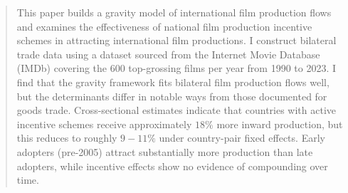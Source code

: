 \begin{abstract}
This paper builds a gravity model of international film production flows and examines the effectiveness of national film production incentive schemes in attracting international film productions. I construct bilateral trade data using a dataset sourced from the Internet Movie Database (IMDb) covering the 600 top-grossing films per year from 1990 to 2023. I find that the gravity framework fits bilateral film production flows well, but the determinants differ in notable ways from those documented for goods trade. Cross-sectional estimates indicate that countries with active incentive schemes receive approximately $18\%$ more inward production, but this reduces to roughly $9-11\%$ under country-pair fixed effects. Early adopters (pre-2005) attract substantially more production than late adopters, while incentive effects show no evidence of compounding over time. 
\end{abstract}
